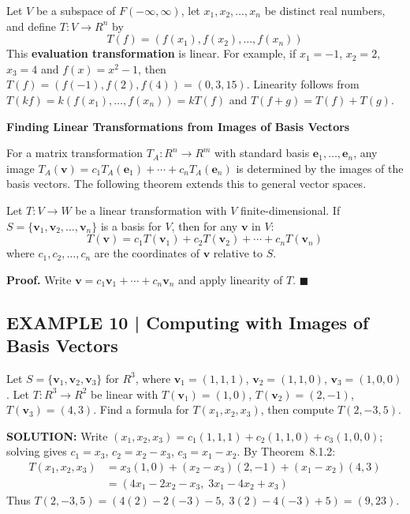 \documentclass{article}
\newcommand{\redheading}[1]{{\vspace{2mm}\noindent\Large\bfseries\color{red!55!black} #1\par}\vspace{2mm}}
\begin{document}
Let $V$ be a subspace of $F(-\infty,\infty)$, let $x_1,x_2,\ldots,x_n$ be distinct real
numbers, and define $T : V \to R^n$ by
\[
  T(f) = (f(x_1), f(x_2), \ldots, f(x_n)) \tag{2}
\]
This \textbf{evaluation transformation} is linear. For example, if $x_1=-1$, $x_2=2$, $x_3=4$
and $f(x)=x^2-1$, then $T(f) = (f(-1), f(2), f(4)) = (0,3,15)$. Linearity follows from
$T(kf) = k(f(x_1),\ldots,f(x_n)) = kT(f)$ and $T(f+g) = T(f)+T(g)$.

\vspace{2mm}

\redheading{Finding Linear Transformations from Images of Basis Vectors}

For a matrix transformation $T_A : R^n \to R^m$ with standard basis $\mathbf{e}_1,\ldots,\mathbf{e}_n$,
any image $T_A(\mathbf{v}) = c_1 T_A(\mathbf{e}_1)+\cdots+c_n T_A(\mathbf{e}_n)$ is determined
by the images of the basis vectors. The following theorem extends this to general vector spaces.

\begin{tcolorbox}[colback=red!4, colframe=red!60!black,
  title={\textbf{Theorem 8.1.2}}, boxrule=0.5mm, arc=3mm]
Let $T : V \to W$ be a linear transformation with $V$ finite-dimensional. If
$S = \{\mathbf{v}_1,\mathbf{v}_2,\ldots,\mathbf{v}_n\}$ is a basis for $V$, then for any $\mathbf{v}$
in $V$:
\[
  T(\mathbf{v}) = c_1 T(\mathbf{v}_1) + c_2 T(\mathbf{v}_2) + \cdots + c_n T(\mathbf{v}_n) \tag{3}
\]
where $c_1,c_2,\ldots,c_n$ are the coordinates of $\mathbf{v}$ relative to $S$.
\end{tcolorbox}

\medskip
\textbf{Proof.} Write $\mathbf{v} = c_1\mathbf{v}_1+\cdots+c_n\mathbf{v}_n$ and apply linearity
of $T$. $\blacksquare$

\subsection*{EXAMPLE 10 | Computing with Images of Basis Vectors}

Let $S = \{\mathbf{v}_1,\mathbf{v}_2,\mathbf{v}_3\}$ for $R^3$, where
$\mathbf{v}_1=(1,1,1)$, $\mathbf{v}_2=(1,1,0)$, $\mathbf{v}_3=(1,0,0)$.
Let $T : R^3 \to R^2$ be linear with
$T(\mathbf{v}_1)=(1,0)$, $T(\mathbf{v}_2)=(2,-1)$, $T(\mathbf{v}_3)=(4,3)$.
Find a formula for $T(x_1,x_2,x_3)$, then compute $T(2,-3,5)$.

\textbf{SOLUTION:} Write $(x_1,x_2,x_3) = c_1(1,1,1)+c_2(1,1,0)+c_3(1,0,0)$; solving gives
$c_1=x_3$, $c_2=x_2-x_3$, $c_3=x_1-x_2$. By Theorem~8.1.2:
\begin{align*}
  T(x_1,x_2,x_3) &= x_3(1,0)+(x_2-x_3)(2,-1)+(x_1-x_2)(4,3)\\
                  &= (4x_1-2x_2-x_3,\; 3x_1-4x_2+x_3)
\end{align*}
Thus $T(2,-3,5) = (4(2)-2(-3)-5,\; 3(2)-4(-3)+5) = (9,23)$.
\end{document}
